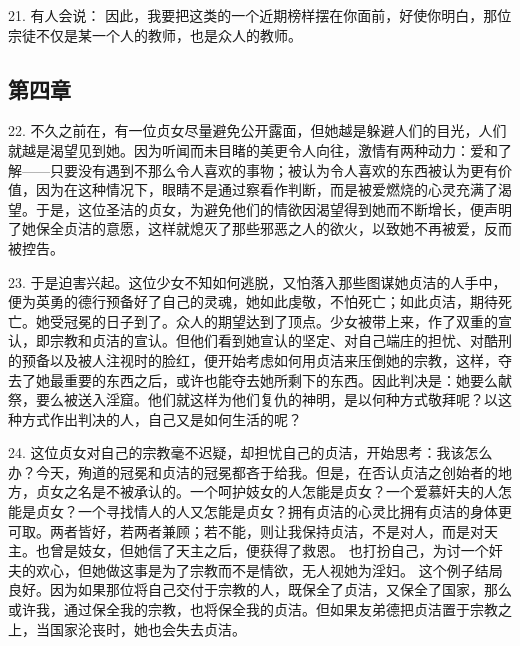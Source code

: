 21. 有人会说： 因此，我要把这类的一个近期榜样摆在你面前，好使你明白，那位宗徒不仅是某一个人的教师，也是众人的教师。\par


\subsection{第四章}

\par

22. 不久之前在，有一位贞女尽量避免公开露面，但她越是躲避人们的目光，人们就越是渴望见到她。因为听闻而未目睹的美更令人向往，激情有两种动力：爱和了解——只要没有遇到不那么令人喜欢的事物；被认为令人喜欢的东西被认为更有价值，因为在这种情况下，眼睛不是通过察看作判断，而是被爱燃烧的心灵充满了渴望。于是，这位圣洁的贞女，为避免他们的情欲因渴望得到她而不断增长，便声明了她保全贞洁的意愿，这样就熄灭了那些邪恶之人的欲火，以致她不再被爱，反而被控告。\par

23. 于是迫害兴起。这位少女不知如何逃脱，又怕落入那些图谋她贞洁的人手中，便为英勇的德行预备好了自己的灵魂，她如此虔敬，不怕死亡；如此贞洁，期待死亡。她受冠冕的日子到了。众人的期望达到了顶点。少女被带上来，作了双重的宣认，即宗教和贞洁的宣认。但他们看到她宣认的坚定、对自己端庄的担忧、对酷刑的预备以及被人注视时的脸红，便开始考虑如何用贞洁来压倒她的宗教，这样，夺去了她最重要的东西之后，或许也能夺去她所剩下的东西。因此判决是：她要么献祭，要么被送入淫窟。他们就这样为他们复仇的神明，是以何种方式敬拜呢？以这种方式作出判决的人，自己又是如何生活的呢？\par

24. 这位贞女对自己的宗教毫不迟疑，却担忧自己的贞洁，开始思考：我该怎么办？今天，殉道的冠冕和贞洁的冠冕都吝于给我。但是，在否认贞洁之创始者的地方，贞女之名是不被承认的。一个呵护妓女的人怎能是贞女？一个爱慕奸夫的人怎能是贞女？一个寻找情人的人又怎能是贞女？拥有贞洁的心灵比拥有贞洁的身体更可取。两者皆好，若两者兼顾；若不能，则让我保持贞洁，不是对人，而是对天主。也曾是妓女，但她信了天主之后，便获得了救恩。 也打扮自己，为讨一个奸夫的欢心，但她做这事是为了宗教而不是情欲，无人视她为淫妇。 这个例子结局良好。因为如果那位将自己交付于宗教的人，既保全了贞洁，又保全了国家，那么或许我，通过保全我的宗教，也将保全我的贞洁。但如果友弟德把贞洁置于宗教之上，当国家沦丧时，她也会失去贞洁。\par


